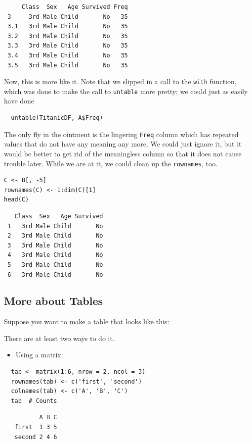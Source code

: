 \documentclass[captions=tableheading]{scrbook}
\begin{document}
\begin{verbatim}
     Class  Sex   Age Survived Freq
 3     3rd Male Child       No   35
 3.1   3rd Male Child       No   35
 3.2   3rd Male Child       No   35
 3.3   3rd Male Child       No   35
 3.4   3rd Male Child       No   35
 3.5   3rd Male Child       No   35
\end{verbatim}

Now, this is more like it. Note that we slipped in a call to the \texttt{with} function, which was done to make the call to \texttt{untable} more pretty; we could just as easily have done
\begin{verbatim}
  untable(TitanicDF, A$Freq)
\end{verbatim}


The only fly in the ointment is the lingering \texttt{Freq} column which has repeated values that do not have any meaning any more. We could just ignore it, but it would be better to get rid of the meaningless column so that it does not cause trouble later. While we are at it, we could clean up the \texttt{rownames}, too.


\begin{verbatim}
C <- B[, -5]
rownames(C) <- 1:dim(C)[1]
head(C)
\end{verbatim}

\begin{verbatim}
   Class  Sex   Age Survived
 1   3rd Male Child       No
 2   3rd Male Child       No
 3   3rd Male Child       No
 4   3rd Male Child       No
 5   3rd Male Child       No
 6   3rd Male Child       No
\end{verbatim}
\subsection{More about Tables}
\label{sec-20-1-6}

Suppose you want to make a table that looks like this:

There are at least two ways to do it.

\begin{itemize}
\item Using a matrix:
\end{itemize}

\begin{verbatim}
  tab <- matrix(1:6, nrow = 2, ncol = 3)
  rownames(tab) <- c('first', 'second')
  colnames(tab) <- c('A', 'B', 'C')
  tab  # Counts
\end{verbatim}

\begin{verbatim}
          A B C
   first  1 3 5
   second 2 4 6
\end{verbatim}
\end{document}

